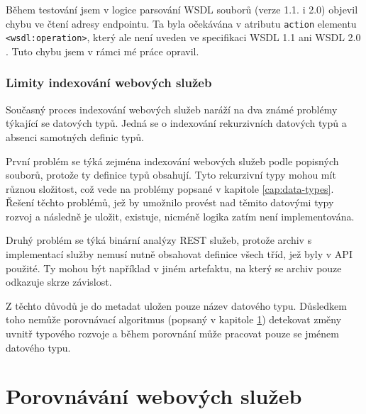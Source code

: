 \documentclass[czech,DP]{thesiskiv}
\begin{document}
Během testování jsem v logice parsování WSDL souborů (verze 1.1. i 2.0) objevil chybu ve čtení adresy endpointu. Ta byla očekávána v atributu \verb|action| elementu \verb|<wsdl:operation>|, který ale není uveden ve specifikaci WSDL 1.1  \cite{wsdl1} ani WSDL 2.0 \cite{wsdl2}. Tuto chybu jsem v rámci mé práce opravil.

\subsection{Limity indexování webových služeb}

Současný proces indexování webových služeb naráží na dva známé problémy týkající se datových typů. Jedná se o indexování rekurzivních datových typů a absenci samotných definic typů.

První problém se týká zejména indexování webových služeb podle popisných souborů, protože ty definice typů obsahují. Tyto rekurzivní typy mohou mít různou složitost, což vede na problémy popsané v kapitole \ref{cap:data-types}. Řešení těchto problémů, jež by umožnilo provést nad těmito datovými typy rozvoj a následně je uložit, existuje, nicméně logika zatím není implementována. 

Druhý problém se týká binární analýzy REST služeb, protože archiv s implementací služby nemusí nutně obsahovat definice všech tříd, jež byly v API použité. Ty mohou být například v jiném artefaktu, na který se archiv pouze odkazuje skrze závislost.

Z těchto důvodů je do metadat uložen pouze název datového typu. Důsledkem toho nemůže porovnávací algoritmus (popsaný v kapitole \ref{cap:alg}) detekovat změny uvnitř typového rozvoje a během porovnání může pracovat pouze se jménem datového typu.


\chapter{Porovnávání webových služeb}
\label{cap:alg}
\end{document}
